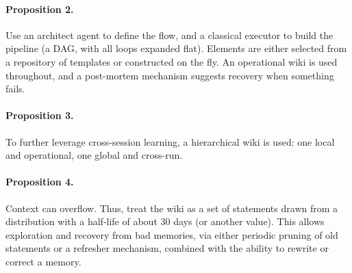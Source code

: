 \paragraph{Proposition 2.} Use an architect agent to define the flow, and a classical executor to build the pipeline (a DAG, with all loops expanded flat). Elements are either selected from a repository of templates or constructed on the fly. An operational wiki is used throughout, and a post-mortem mechanism suggests recovery when something fails.

\paragraph{Proposition 3.} To further leverage cross-session learning, a hierarchical wiki is used: one local and operational, one global and cross-run.

\paragraph{Proposition 4.} Context can overflow. Thus, treat the wiki as a set of statements drawn from a distribution with a half-life of about 30 days (or another value). This allows exploration and recovery from bad memories, via either periodic pruning of old statements or a refresher mechanism, combined with the ability to rewrite or correct a memory.